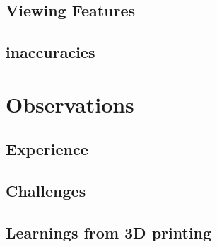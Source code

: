 \documentclass{article}
\begin{document}
\subsection{Viewing Features}
\subsection{inaccuracies}


\section{Observations}
\subsection{Experience}
\subsection{Challenges}
\subsection{Learnings from 3D printing}
\end{document}

